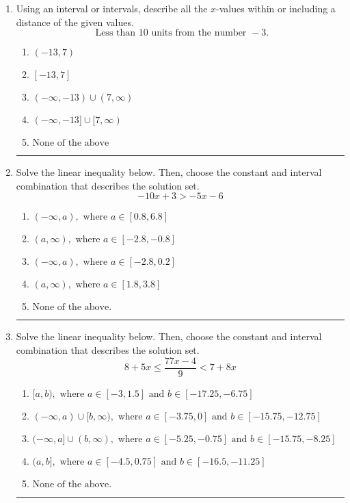 \documentclass[14pt]{extbook}
\newcommand{\litem}[1]{\item#1\hspace*{-1cm}\rule{\textwidth}{0.4pt}}
\begin{document}
\begin{enumerate}
\litem{
Using an interval or intervals, describe all the $x$-values within or including a distance of the given values.\[ \text{ Less than } 10 \text{ units from the number } -3. \]\begin{enumerate}[label=\Alph*.]
\item \( (-13, 7) \)
\item \( [-13, 7] \)
\item \( (-\infty, -13) \cup (7, \infty) \)
\item \( (-\infty, -13] \cup [7, \infty) \)
\item \( \text{None of the above} \)

\end{enumerate} }
\litem{
Solve the linear inequality below. Then, choose the constant and interval combination that describes the solution set.\[ -10x + 3 > -5x -6 \]\begin{enumerate}[label=\Alph*.]
\item \( (-\infty, a), \text{ where } a \in [0.8, 6.8] \)
\item \( (a, \infty), \text{ where } a \in [-2.8, -0.8] \)
\item \( (-\infty, a), \text{ where } a \in [-2.8, 0.2] \)
\item \( (a, \infty), \text{ where } a \in [1.8, 3.8] \)
\item \( \text{None of the above}. \)

\end{enumerate} }
\litem{
Solve the linear inequality below. Then, choose the constant and interval combination that describes the solution set.\[ 8 + 5 x \leq \frac{77 x - 4}{9} < 7 + 8 x \]\begin{enumerate}[label=\Alph*.]
\item \( [a, b), \text{ where } a \in [-3, 1.5] \text{ and } b \in [-17.25, -6.75] \)
\item \( (-\infty, a) \cup [b, \infty), \text{ where } a \in [-3.75, 0] \text{ and } b \in [-15.75, -12.75] \)
\item \( (-\infty, a] \cup (b, \infty), \text{ where } a \in [-5.25, -0.75] \text{ and } b \in [-15.75, -8.25] \)
\item \( (a, b], \text{ where } a \in [-4.5, 0.75] \text{ and } b \in [-16.5, -11.25] \)
\item \( \text{None of the above.} \)


\end{enumerate}}
\end{enumerate}
\end{document}
